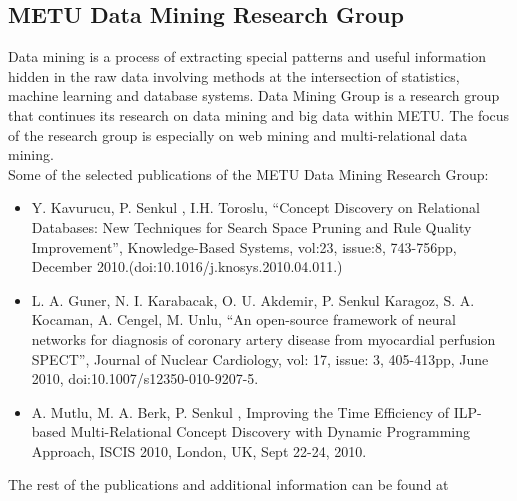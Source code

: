 \subsection{METU Data Mining Research Group}
Data mining is a process of extracting special patterns and useful information hidden in the raw data involving methods at the intersection of statistics, machine learning and database systems.
Data Mining Group is a research group that continues its research on data mining and big data within METU.
The focus of the research group is especially on web mining and multi-relational data mining.\\

Some of the selected publications of the METU Data Mining Research Group:
\begin{itemize}
\item Y. Kavurucu, P. Senkul , I.H. Toroslu, “Concept Discovery on Relational Databases: New Techniques for Search Space Pruning and Rule Quality Improvement”, Knowledge-Based Systems, vol:23, issue:8, 743-756pp, December 2010.(doi:10.1016/j.knosys.2010.04.011.)
\item L. A. Guner, N. I. Karabacak, O. U. Akdemir, P. Senkul Karagoz, S. A. Kocaman, A. Cengel, M. Unlu, “An open-source framework of neural networks for diagnosis of coronary artery disease from myocardial perfusion SPECT”, Journal of Nuclear Cardiology, vol: 17, issue: 3, 405-413pp, June 2010, doi:10.1007/s12350-010-9207-5.
\item A. Mutlu, M. A. Berk, P. Senkul , Improving the Time Efficiency of ILP-based Multi-Relational Concept Discovery with Dynamic Programming Approach, ISCIS 2010, London, UK, Sept 22-24, 2010.
\end{itemize}
The rest of the publications and additional information can be found at \cite{Datamining}
